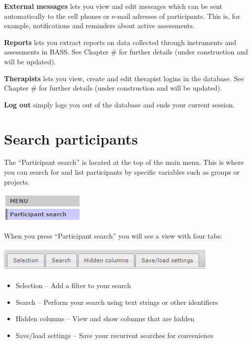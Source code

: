 \documentclass[]{book}
\providecommand{\tightlist}{%
  \setlength{\itemsep}{0pt}\setlength{\parskip}{0pt}}
\begin{document}
\textbf{External messages} lets you view and edit messages which can be sent automatically to the cell phones or e-mail adresses of participants. This is, for example, notifications and reminders about active assessments.

\textbf{Reports} lets you extract reports on data collected through instruments and assessments in BASS. See Chapter \# for further details (under construction and will be updated).

\textbf{Therapists} lets you view, create and edit therapist logins in the database. See Chapter \# for further details (under construction and will be updated).

\textbf{Log out} simply logs you out of the database and ends your current session.

\hypertarget{search-participants}{%
\chapter{Search participants}\label{search-participants}}

The ``Participant search'' is located at the top of the main menu. This is where you can search for and list participants by specific variables such as groups or projects.

\includegraphics{images/search-participants-menu.png}

When you press ``Participant search'' you will see a view with four tabs:

\includegraphics{images/search-participants-tab.png}

\begin{itemize}
\tightlist
\item
  Selection -- Add a filter to your search
\item
  Search -- Perform your search using text strings or other identifiers
\item
  Hidden columns -- View and show columns that are hidden
\item
  Save/load settings -- Save your recurrent searches for convenience
\end{itemize}
\end{document}
